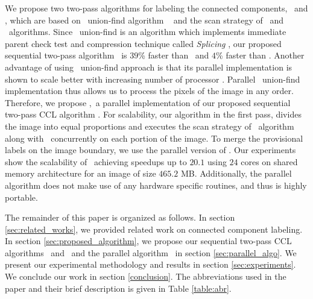 
We propose two two-pass algorithms for labeling the connected components, \aremsp\ and \nremsp, which are based on \rems\ union-find algorithm
\remsp\ \cite{Patwary2010_RemSP, Dijkstra1976_RemSP} and the scan strategy of \arun\ and
\lrpc\ algorithms.
Since \rems\ union-find is an algorithm which implements immediate parent check test and 
compression technique called {\em Splicing} \cite{Patwary2010_RemSP,
Dijkstra1976_RemSP}, our proposed sequential two-pass algorithm \aremsp\ is $39$\% faster than \lrpc\
and $4$\% faster than \arun.
Another advantage of using \rems\ union-find approach is that its parallel implementation is shown to scale better
with increasing number of processor \cite{Patwary2012_PARemSP}. Parallel \rems\ union-find implementation thus allows us to
process the pixels of the image in any order. Therefore, we propose \paremsp,\ a parallel implementation of our proposed
sequential two-pass CCL algorithm \aremsp. For
scalability, our algorithm in the first pass, divides the image into equal proportions and executes the scan strategy of \arun\ algorithm along with \remsp\
concurrently on each portion of the image. To merge the provisional labels on the image boundary, we use the parallel version
of \remsp \cite{Patwary2012_PARemSP}. Our experiments show
the scalability of \paremsp\ achieving speedups up to $20.1$ using $24$ cores
on shared memory architecture for an image of size $465.2$ MB.
Additionally, the parallel algorithm does not make use of any hardware specific routines, and thus is highly portable.

The remainder of this paper is organized as follows. In section
\ref{sec:related_works}, we provided related work on connected component labeling.
In section \ref{sec:proposed_algorithm}, we propose our sequential two-pass CCL
algorithms \nremsp\ and \aremsp\ and the parallel algorithm \paremsp\ in section
\ref{sec:parallel_algo}.
We present our experimental methodology and results in section
\ref{sec:experiments}. We conclude our work in section
\ref{conclusion}. The abbreviations used in the paper and their brief
description is given in Table \ref{table:abr}.


